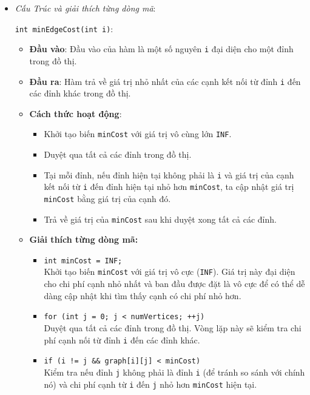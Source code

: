 \documentclass[a4paper]{article}
\begin{document}
\begin{itemize}
\item \textit{Cấu Trúc và giải thích từng dòng mã}:

\texttt{int minEdgeCost(int i)}:
\begin{itemize}
\item \textbf{Đầu vào}: Đầu vào của hàm là một số nguyên \texttt{i} đại diện cho một đỉnh trong đồ thị.
\item \textbf{Đầu ra}: Hàm trả về giá trị nhỏ nhất của các cạnh kết nối từ đỉnh \texttt{i} đến các đỉnh khác trong đồ thị.
\item \textbf{Cách thức hoạt động}:
\begin{itemize}
\item Khởi tạo biến \texttt{minCost} với giá trị vô cùng lớn \texttt{INF}.
\item Duyệt qua tất cả các đỉnh trong đồ thị.
\item Tại mỗi đỉnh, nếu đỉnh hiện tại không phải là \texttt{i} và giá trị của cạnh kết nối từ \texttt{i} đến đỉnh hiện tại nhỏ hơn \texttt{minCost}, ta cập nhật giá trị \texttt{minCost} bằng giá trị của cạnh đó.
\item Trả về giá trị của \texttt{minCost} sau khi duyệt xong tất cả các đỉnh.
\end{itemize}
\end{itemize}
\begin{itemize}
    \item \textbf{Giải thích từng dòng mã:}
    \begin{itemize}
        \item \texttt{int minCost = INF;} \\
        Khởi tạo biến \texttt{minCost} với giá trị vô cực (\texttt{INF}). Giá trị này đại diện cho chi phí cạnh nhỏ nhất và ban đầu được đặt là vô cực để có thể dễ dàng cập nhật khi tìm thấy cạnh có chi phí nhỏ hơn.

        \item \texttt{for (int j = 0; j < numVertices; ++j)} \\
        Duyệt qua tất cả các đỉnh trong đồ thị. Vòng lặp này sẽ kiểm tra chi phí cạnh nối từ đỉnh \texttt{i} đến các đỉnh khác.

        \item \texttt{if (i != j && graph[i][j] < minCost)} \\
        Kiểm tra nếu đỉnh \texttt{j} không phải là đỉnh \texttt{i} (để tránh so sánh với chính nó) và chi phí cạnh từ \texttt{i} đến \texttt{j} nhỏ hơn \texttt{minCost} hiện tại.


\end{itemize}
\end{itemize}
\end{itemize}
\end{document}
